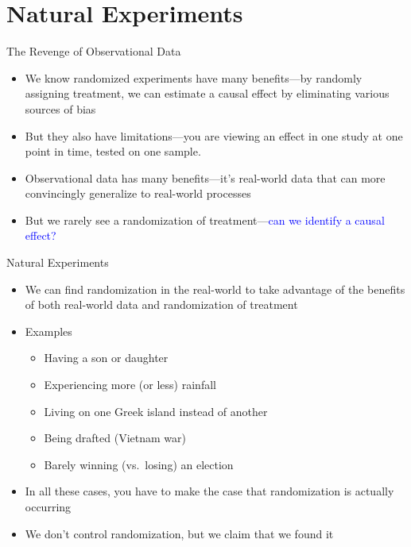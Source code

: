 \documentclass[
  11pt,
  ignorenonframetext,
]{beamer}
\providecommand{\tightlist}{%
  \setlength{\itemsep}{0pt}\setlength{\parskip}{0pt}}
\begin{document}
\section{Natural Experiments}\label{natural-experiments}

\begin{frame}{The Revenge of Observational Data}
\protect{}\label{the-revenge-of-observational-data}
\begin{itemize}
\tightlist
\item
  We know randomized experiments have many benefits---by randomly
  assigning treatment, we can estimate a causal effect by eliminating
  various sources of bias \pause
\item
  But they also have limitations---you are viewing an effect in one
  study at one point in time, tested on one sample. \pause
\item
  Observational data has many benefits---it's real-world data that can
  more convincingly generalize to real-world processes \pause
\item
  But we rarely see a randomization of
  treatment---\textcolor{blue}{can we identify a causal effect?}
\end{itemize}
\end{frame}

\begin{frame}{Natural Experiments}
\protect{}\label{natural-experiments-1}
\begin{itemize}
\tightlist
\item
  We can find randomization in the real-world to take advantage of the
  benefits of both real-world data and randomization of treatment \pause
\item
  Examples \pause

  \begin{itemize}
  \tightlist
  \item
    Having a son or daughter \pause
  \item
    Experiencing more (or less) rainfall \pause
  \item
    Living on one Greek island instead of another \pause
  \item
    Being drafted (Vietnam war) \pause
  \item
    Barely winning (vs.~losing) an election \pause
  \end{itemize}
\item
  In all these cases, you have to make the case that randomization is
  actually occurring \pause
\item
  We don't control randomization, but we claim that we found it
\end{itemize}
\end{frame}
\end{document}

